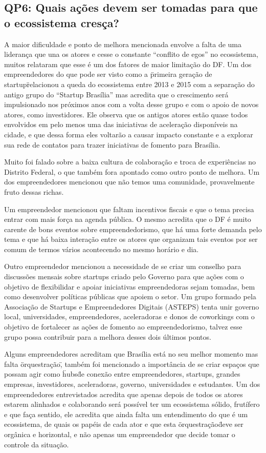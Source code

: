\subsection{QP6: Quais ações devem ser tomadas para que o ecossistema cresça?}
\label{subsection:pergunta_de_pesquisa_6}

A maior dificuldade e ponto de melhora mencionada envolve a falta de uma liderança que una os atores e cesse o constante ``conflito de egos'' no ecossistema, muitos relataram que esse é um dos fatores de maior limitação do DF. Um dos empreendedores do que pode ser visto como a \"primeira geração de startup\" relacionou a queda do ecossistema entre 2013 e 2015 com a separação do antigo grupo do ``Startup Brasília'' mas acredita que o crescimento será impulsionado nos próximos anos com a volta desse grupo e com o apoio de novos atores, como investidores. Ele observa que os antigos atores estão quase todos envolvidos em pelo menos uma das iniciativas de aceleração disponíveis na cidade, e que dessa forma eles voltarão a causar impacto constante e a explorar sua rede de contatos para trazer iniciativas de fomento para Brasília.  

Muito foi falado sobre a baixa cultura de colaboração e troca de experiências no Distrito Federal, o que também fora apontado como outro ponto de melhora. Um dos empreendedores mencionou que não temos uma comunidade, provavelmente fruto dessas richas. 

Um empreendedor mencionou que faltam incentivos fiscais e que o tema precisa entrar com mais força na agenda pública. O mesmo acredita que o DF é muito carente de bons eventos sobre empreendedorismo, que há uma forte demanda pelo tema e que há baixa interação entre os atores que organizam tais eventos por ser comum de termos vários acontecendo no mesmo horário e dia. 

Outro empreendedor mencionou a necessidade de se criar um conselho para discussões mensais sobre startups criado pelo Governo para que ações com o objetivo de flexibilidar e apoiar iniciativas empreendedoras sejam tomadas, bem como desenvolver políticas públicas que apoiem o setor. Um grupo formado pela Associação de Startups e Empreendedores Digitais (ASTEPS) tenta unir governo local, universidades, empreendedores, aceleradoras e donos de coworkings com o objetivo de fortalecer as ações de fomento ao empreendedorismo, talvez esse grupo possa contribuir para a melhora desses  dois últimos pontos.

Alguns empreendedores acreditam que Brasília está no seu melhor momento mas falta \"orquestração\", também foi mencionado a importância de se criar espaços que possam agir como \"hubs\" de conexão entre empreendedores, startups, grandes empresas, investidores, aceleradoras, governo, universidades e estudantes. Um dos empreendedores entrevistados acredita que apenas depois de todos os atores estarem alinhados e colaborando será possível ter um ecossistema sólido, frutífero e que faça sentido, ele acredita que ainda falta um entendimento do que é um ecossistema, de quais os papéis de cada ator e que esta \"orquestração\" deve ser orgânica e horizontal, e não apenas um empreendedor que decide tomar o controle da situação. 


